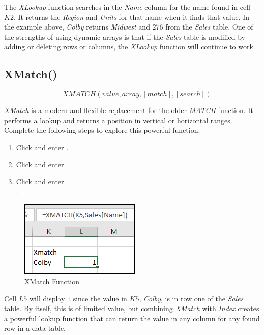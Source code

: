 The \textit{XLookup} function searches in the \textit{Name} column for the name found in cell $ K2 $. It returns the \textit{Region} and \textit{Units} for that name when it finds that value. In the example above, \textit{Colby} returns \textit{Midwest} and $ 276 $ from the \textit{Sales} table. One of the strengths of using dynamic arrays is that if the \textit{Sales} table is modified by adding or deleting rows or columns, the \textit{XLookup} function will continue to work.

\subsection{XMatch()}

\[ =XMATCH(value, array, [match], [search]) \]

\textit{XMatch} is a modern and flexible replacement for the older \textit{MATCH} function. It performs a lookup and returns a position in vertical or horizontal ranges. Complete the following steps to explore this powerful function.

\begin{enumbox}
	\begin{enumerate}
		\item Click  and enter .
		\item Click  and enter 
		\item Click  and enter \\ .
	\end{enumerate}
\end{enumbox}

\begin{figure}[H]
	\centering
	\includegraphics[width=\maxwidth{.50\linewidth}]{gfx/apb_fig06}
	\caption{XMatch Function}
	\label{apb:fig06}
\end{figure}

Cell $ L5 $ will display $ 1 $ since the value in $ K5 $, \textit{Colby}, is in row one of the \textit{Sales} table. By itself, this is of limited value, but combining \textit{XMatch} with \textit{Index} creates a powerful lookup function that can return the value in any column for any found row in a data table.

